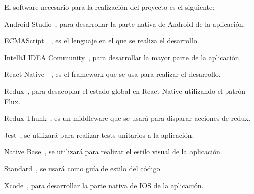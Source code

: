  El software necesario para la realización del proyecto es el siguiente:
\begin{description}
	\item Android Studio~\cite{ASTUDIO}, para desarrollar la parte nativa de Android de la aplicación.
	\item ECMAScript~\cite{ECMA}~\cite{ECMABOOK}, es el lenguaje en el que se realiza el desarrollo.
	\item IntelliJ IDEA Community~\cite{IDEA}, para desarrollar la mayor parte de la aplicación.
	\item React Native~\cite{RENA}~\cite{REACTBOOK}, es el framework que se usa para realizar el desarrollo.
	\item Redux~\cite{REDUX}, para desacoplar el estado global en React Native utilizando el patrón Flux.
	\item Redux Thunk~\cite{THUNK}, es un middleware que se usará para disparar acciones de redux.
	\item Jest~\cite{JEST}, se utilizará para realizar tests unitarios a la aplicación.
	\item Native Base~\cite{NABA}, se utilizará para realizar el estilo visual de la aplicación.
	\item Standard~\cite{STAND}, se usará como guía de estilo del código.
	\item Xcode~\cite{XCODE}, para desarrollar la parte nativa de IOS de la aplicación.
\end{description}

